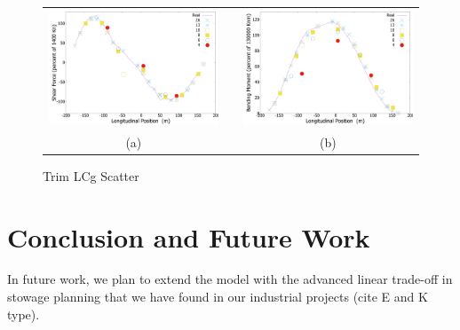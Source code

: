 \documentclass[runningheads]{llncs}
\begin{document}
 
\begin{figure}[h!]
\begin{center}
 \begin{tabular}{ccc}
  \includegraphics[scale=0.12]{figures/ShearForceplot} & & \includegraphics[scale=0.12]{figures/BendingMomentplot} \\
  (a) & \hspace{5mm} & (b)
\end{tabular}  
\end{center}
\caption{Trim LCg Scatter}
\label{fig:trimlcgscatter}
\end{figure}
 
 
 
 
 
\section{Conclusion and Future Work}

 In future work, we plan to extend the model with the advanced linear trade-off in stowage planning that we have found in our  industrial projects (cite E and K type).    



\end{document}
